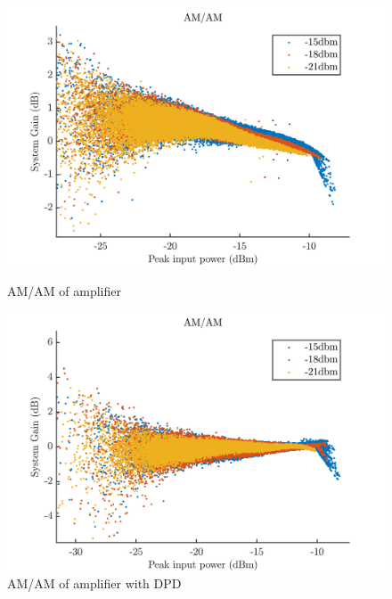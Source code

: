 \begin{figure}[H]
  \centering
  \begin{minipage}[b]{0.5\textwidth}
	\includegraphics[scale = 0.5]{figures/measurement/cree/amam_cree_amp_no_dpd.png}
	\caption{AM/AM of amplifier}
    \label{fig:cree_amam1}
  \end{minipage}
  \hfill
  \begin{minipage}[b]{0.4\textwidth}
\includegraphics[scale = 0.5]{figures/measurement/cree/amam_cree_amp_with_dpd.png}
\caption{AM/AM of amplifier with DPD}
    \label{fig:cree_amam2}
  \end{minipage}
\end{figure}


